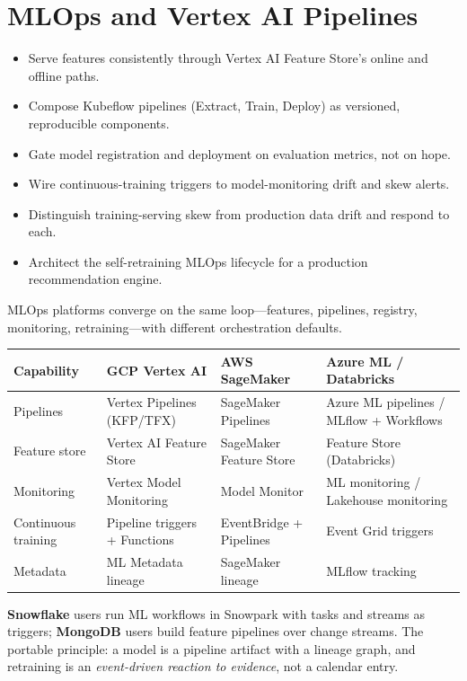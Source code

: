 \chapter{MLOps and Vertex AI Pipelines}

\begin{objectives}
\begin{itemize}
    \item Serve features consistently through Vertex AI Feature Store's online and offline paths.
    \item Compose Kubeflow pipelines (Extract, Train, Deploy) as versioned, reproducible components.
    \item Gate model registration and deployment on evaluation metrics, not on hope.
    \item Wire continuous-training triggers to model-monitoring drift and skew alerts.
    \item Distinguish training-serving skew from production data drift and respond to each.
    \item Architect the self-retraining MLOps lifecycle for a production recommendation engine.
\end{itemize}
\end{objectives}

\begin{crosscloud}
MLOps platforms converge on the same loop---features, pipelines, registry, monitoring, retraining---with different orchestration defaults.

\vspace{2mm}
{\footnotesize
\begin{tabular}{@{}p{2.8cm}p{3.0cm}p{3.0cm}p{3.0cm}@{}} \\
\toprule
\textbf{Capability} & \textbf{GCP Vertex AI} & \textbf{AWS SageMaker} & \textbf{Azure ML / Databricks} \\
\midrule
Pipelines & Vertex Pipelines (KFP/TFX) & SageMaker Pipelines & Azure ML pipelines / MLflow + Workflows \\
Feature store & Vertex AI Feature Store & SageMaker Feature Store & Feature Store (Databricks) \\
Monitoring & Vertex Model Monitoring & Model Monitor & ML monitoring / Lakehouse monitoring \\
Continuous training & Pipeline triggers + Functions & EventBridge + Pipelines & Event Grid triggers \\
Metadata & ML Metadata lineage & SageMaker lineage & MLflow tracking \\
\bottomrule
\end{tabular}}

\vspace{1mm}
\textbf{Snowflake} users run ML workflows in Snowpark with tasks and streams as triggers; \textbf{MongoDB} users build feature pipelines over change streams. The portable principle: a model is a pipeline artifact with a lineage graph, and retraining is an \emph{event-driven reaction to evidence}, not a calendar entry.
\end{crosscloud}

